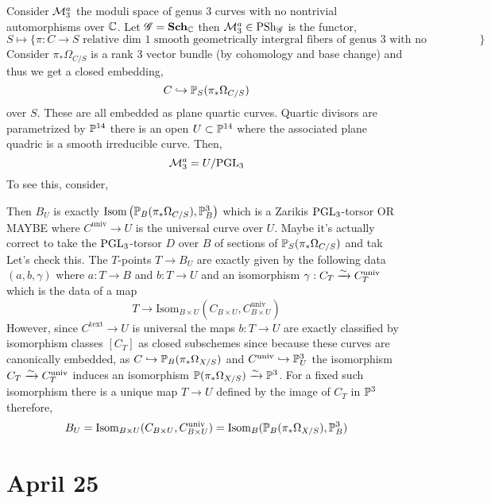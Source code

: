 \documentclass[12pt]{article}
\begin{document}
Consider $\M^a_3$ the moduli space of genus $3$ curves with no nontrivial automorphisms over $\CC$. Let $\G = \Sch_{\CC}$ then $\M^a_3 \in \PSh_\G$ is the functor,
\[ S \mapsto \{ \pi :  C \to S \text{ relative dim 1 smooth geometrically intergral fibers of genus 3 with no automorphisms} \} \]
Consider $\pi_* \Omega_{C/S}$ is a rank $3$ vector bundle (by cohomology and base change) and thus we get a closed embedding,
\[ C \embed \P_S(\pi_* \Omega_{C/S}) \]
over $S$. These are all embedded as plane quartic curves. Quartic divisors are parametrized by $\P^{14}$ there is an open $U \subset \P^{14}$ where the associated plane quadric is a smooth irreducible curve. Then,
\[ \M^a_{3} = U / \PGL_{3} \]
To see this, consider,
\begin{center}
\end{center}
Then $B_U$ is exactly $\Isom{\P_B(\pi_* \Omega_{C/S})}{\P^3_B}$ which is a Zarikis $\PGL_3$-torsor OR MAYBE where $C^{\text{univ}} \to U$ is the universal curve over $U$. Maybe it's actually correct to take the $\PGL_3$-torsor $D$ over $B$ of sections of $\P_S(\pi_* \Omega_{C/S})$ and tak
\bigskip\\
Let's check this. The $T$-points $T \to B_U$ are exactly given by the following data $(a, b, \gamma)$ where $a : T \to B$ and $b : T \to U$ and an isomorphism $\gamma : C_T \iso C^{\text{univ}}_T$ which is the data of a map 
\[ T \to \mathrm{Isom}_{B \times U}(C_{B \times U}, C^{\text{univ}}_{B \times U}) \]
However, since $C^{\text{text}} \to U$ is universal the maps $b : T \to U$ are exactly classified by isomorphism classes $[C_T]$ as closed subschemes since because these curves are canonically embedded, as $C \embed \P_B(\pi_* \Omega_{X/S})$ and $C^{\text{univ}} \embed \P^3_U$ the isomorphism $C_T \iso C_T^{\text{univ}}$ induces an isomorphism $\P(\pi_* \Omega_{X/S}) \iso \P^3$. For a fixed such isomorphism there is a unique map $T \to U$ defined by the image of $C_T$ in $\P^3$ therefore,
\[ B_U = \mathrm{Isom}_{B \times U}(C_{B \times U}, C^{\text{univ}}_{B \times U}) = \mathrm{Isom}_{B}(\P_B(\pi_* \Omega_{X/S}), \P^3_B) \]

\section{April 25}
\end{document}
